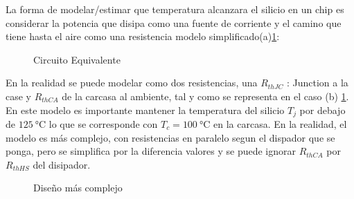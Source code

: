 
La forma de modelar/estimar que temperatura alcanzara el silicio en un chip es considerar
la potencia que disipa como una fuente de corriente y el camino que tiene hasta el aire como
una resistencia modelo simplificado(a)\ref{fig:ThermalEquivalent}:

\begin{figure}[H]
    \centering
    
    \caption{Circuito Equivalente}
    \label{fig:ThermalEquivalent}
\end{figure}

En la realidad se puede modelar como dos resistencias, una $R_{thJC}$ : Junction a la case y $R_{thCA}$ de la carcasa al ambiente,
tal y como se representa en el caso (b) \ref{fig:ThermalEquivalent}.
En este modelo es importante mantener la temperatura del silicio $T_j$ por debajo de $\SI{125}{\celsius}$ lo que se corresponde con $T_c=\SI{100}{\celsius}$ en la carcasa. En la realidad, el modelo es más complejo, con resistencias en paralelo segun el dispador que se ponga, pero se simplifica por la diferencia valores y se puede ignorar $R_{thCA}$ por $R_{thHS}$ del disipador. 

\begin{figure}[H]
    \centering
    
    \caption{Diseño más complejo}
    \label{fig:ThermalEquivFull}
\end{figure}